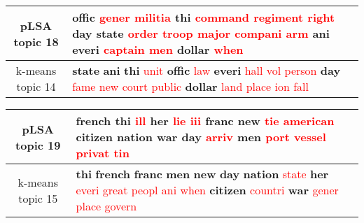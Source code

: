 \begin{center}\begin{tabularx}{\textwidth} {
  | c | >{\raggedright\arraybackslash}X | } \hline 
pLSA topic 18 & \textbf{offic} \textcolor{red}{gener} \textcolor{red}{militia} \textbf{thi} \textcolor{red}{command} \textcolor{red}{regiment} \textcolor{red}{right} \textbf{day} \textbf{state} \textcolor{red}{order} \textcolor{red}{troop} \textcolor{red}{major} \textcolor{red}{compani} \textcolor{red}{arm} \textbf{ani} \textbf{everi} \textcolor{red}{captain} \textcolor{red}{men} \textbf{dollar} \textcolor{red}{when} \\ \hline 
k-means topic 14 & \textbf{state} \textbf{ani} \textbf{thi} \textcolor{red}{unit} \textbf{offic} \textcolor{red}{law} \textbf{everi} \textcolor{red}{hall} \textcolor{red}{vol} \textcolor{red}{person} \textbf{day} \textcolor{red}{fame} \textcolor{red}{new} \textcolor{red}{court} \textcolor{red}{public} \textbf{dollar} \textcolor{red}{land} \textcolor{red}{place} \textcolor{red}{ion} \textcolor{red}{fall} \\ \hline 
\end{tabularx}

\end{center}

\begin{center}\begin{tabularx}{\textwidth} {
  | c | >{\raggedright\arraybackslash}X | } \hline 
pLSA topic 19 & \textbf{french} \textbf{thi} \textcolor{red}{ill} \textbf{her} \textcolor{red}{lie} \textcolor{red}{iii} \textbf{franc} \textbf{new} \textcolor{red}{tie} \textcolor{red}{american} \textbf{citizen} \textbf{nation} \textbf{war} \textbf{day} \textcolor{red}{arriv} \textbf{men} \textcolor{red}{port} \textcolor{red}{vessel} \textcolor{red}{privat} \textcolor{red}{tin} \\ \hline 
k-means topic 15 & \textbf{thi} \textbf{french} \textbf{franc} \textbf{men} \textbf{new} \textbf{day} \textbf{nation} \textcolor{red}{state} \textbf{her} \textcolor{red}{everi} \textcolor{red}{great} \textcolor{red}{peopl} \textcolor{red}{ani} \textcolor{red}{when} \textbf{citizen} \textcolor{red}{countri} \textbf{war} \textcolor{red}{gener} \textcolor{red}{place} \textcolor{red}{govern} \\ \hline 
\end{tabularx}

\end{center}

